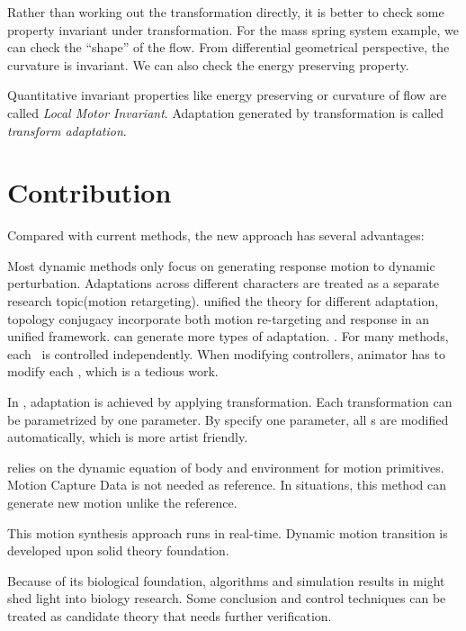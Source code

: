 Rather than working out the transformation directly,
it is better to check some property invariant under transformation.
For the mass spring system example, we can check the ``shape'' of the flow.
From differential geometrical perspective,  the curvature is invariant.
We can also check the energy preserving property. 
 


Quantitative invariant properties like energy preserving or curvature of flow are called \emph{Local Motor Invariant}. 
Adaptation generated by transformation is called \emph{transform adaptation}.

\section{Contribution}

Compared with current \cms methods, the new approach has several advantages:
\begin{enumerate}
Most dynamic methods only focus on generating response motion to dynamic perturbation.
Adaptations across different characters are treated as a separate  research topic(motion retargeting).
\moit unified the theory for different adaptation, topology conjugacy  incorporate both motion re-targeting and  response  in an unified framework.
\moit can generate more types of adaptation.
.
For many \cms methods, each \dof ~is controlled independently.
When modifying controllers, animator has to modify each \dof, which is a tedious work.

In \moit, adaptation is achieved by applying transformation.
Each transformation can be parametrized by one parameter.
By specify one parameter, all \dof s are modified automatically, which is more artist friendly.

\moit relies on the dynamic equation of body and environment for motion primitives.
Motion Capture Data is not needed as reference.
In situations, this method can generate new motion unlike the reference.


This motion synthesis approach runs in real-time.
Dynamic motion transition is developed upon solid theory foundation.

\end{enumerate}

Because of its biological foundation,
algorithms and simulation results in \moit  might shed light into biology research.
Some conclusion and control techniques can be treated as candidate theory that needs further verification.


